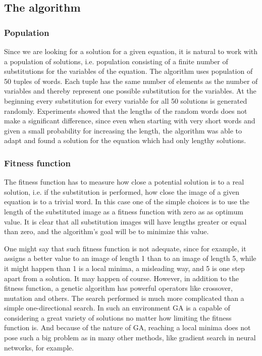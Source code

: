 \documentclass{article}
\begin{document}
  \subsection{The algorithm}

    \subsubsection{Population}

Since we are looking for a solution for a given equation, it is
natural to work with a population of solutions, i.e. population
consisting of a finite number of substitutions for the variables of
the equation. The algorithm uses population of 50 tuples of
words. Each tuple has the same number of elements as the number of
variables and thereby represent one possible substitution for the
variables. At the beginning every substitution for every variable for
all 50 solutions is generated randomly. Experiments showed that the
lengths of the random words does not make a significant difference,
since even when starting with very short words and given a small
probability for increasing the length, the algorithm was able to adapt
and found a solution for the equation which had only lengthy
solutions.

    \subsubsection{Fitness function}

The fitness function has to measure how close a potential solution is
to a real solution, i.e. if the substitution is performed, how close
the image of a given equation is to a trivial word. In this case one
of the simple choices is to use the length of the substituted image as
a fitness function with zero as as optimum value. It is clear that all
substitution images will have lengths greater or equal than zero, and
the algorithm's goal will be to minimize this value.

One might say that such fitness function is not adequate, since for
example, it assigns a better value to an image of length 1 than to an
image of length 5, while it might happen than 1 is a local minima, a
misleading way, and 5 is one step apart from a solution. It may happen
of course.  However, in addition to the fitness function, a genetic
algorithm has powerful operators like crossover, mutation and others.
The search performed is much more complicated than a simple
one-directional search. In such an environment GA is a capable of
considering a great variety of solutions no matter how limiting the
fitness function is. And because of the nature of GA, reaching a local
minima does not pose such a big problem as in many other methods, like
gradient search in neural networks, for example.
\end{document}
